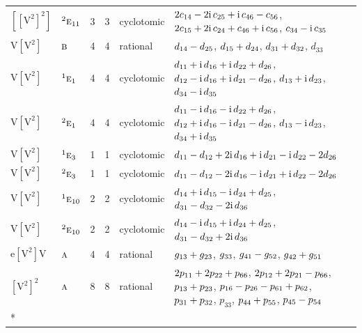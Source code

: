\documentclass[10pt,a4paper]{article}
\numberwithin{equation}{section}
\newcommand{\irr}[1]{\text{\normalfont\scshape #1}}
\newcommand{\conjpair}[1]{{}^{#1}}
\newcommand{\iunit}{\mathrm{i}}
\newcommand{\jahn}[1]{\mathrm{#1}}
\newlength{\fillwidth}\newlength{\cellwidth}\newlength{\colwidth}
\newcommand{\signbreak}{\penalty100\relax}
\begin{document}
{\begin{longtable}{@{}llrrl>{\RaggedRight\arraybackslash}p{\fillwidth}@{}}
$\jahn{[[V^{2}]^{2}]}$ & $\conjpair{2}\irr{e}_{11}$ & 3 & 3 & cyclotomic & $2c_{14} -\signbreak 2\iunit{}\,c_{25} +\signbreak \iunit{}\,c_{46} -\signbreak c_{56}$, $2c_{15} +\signbreak 2\iunit{}\,c_{24} +\signbreak c_{46} +\signbreak \iunit{}\,c_{56}$, $c_{34} -\signbreak \iunit{}\,c_{35}$\\
$\jahn{V[V^{2}]}$ & $\irr{b}$ & 4 & 4 & rational & $d_{14} -\signbreak d_{25}$, $d_{15} +\signbreak d_{24}$, $d_{31} +\signbreak d_{32}$, $d_{33}$\\
$\jahn{V[V^{2}]}$ & $\conjpair{1}\irr{e}_{1}$ & 4 & 4 & cyclotomic & $d_{11} +\signbreak \iunit{}\,d_{16} +\signbreak \iunit{}\,d_{22} +\signbreak d_{26}$, $d_{12} -\signbreak \iunit{}\,d_{16} +\signbreak \iunit{}\,d_{21} -\signbreak d_{26}$, $d_{13} +\signbreak \iunit{}\,d_{23}$, $d_{34} -\signbreak \iunit{}\,d_{35}$\\
$\jahn{V[V^{2}]}$ & $\conjpair{2}\irr{e}_{1}$ & 4 & 4 & cyclotomic & $d_{11} -\signbreak \iunit{}\,d_{16} -\signbreak \iunit{}\,d_{22} +\signbreak d_{26}$, $d_{12} +\signbreak \iunit{}\,d_{16} -\signbreak \iunit{}\,d_{21} -\signbreak d_{26}$, $d_{13} -\signbreak \iunit{}\,d_{23}$, $d_{34} +\signbreak \iunit{}\,d_{35}$\\
$\jahn{V[V^{2}]}$ & $\conjpair{1}\irr{e}_{3}$ & 1 & 1 & cyclotomic & $d_{11} -\signbreak d_{12} +\signbreak 2\iunit{}\,d_{16} +\signbreak \iunit{}\,d_{21} -\signbreak \iunit{}\,d_{22} -\signbreak 2d_{26}$\\
$\jahn{V[V^{2}]}$ & $\conjpair{2}\irr{e}_{3}$ & 1 & 1 & cyclotomic & $d_{11} -\signbreak d_{12} -\signbreak 2\iunit{}\,d_{16} -\signbreak \iunit{}\,d_{21} +\signbreak \iunit{}\,d_{22} -\signbreak 2d_{26}$\\
$\jahn{V[V^{2}]}$ & $\conjpair{1}\irr{e}_{10}$ & 2 & 2 & cyclotomic & $d_{14} +\signbreak \iunit{}\,d_{15} -\signbreak \iunit{}\,d_{24} +\signbreak d_{25}$, $d_{31} -\signbreak d_{32} -\signbreak 2\iunit{}\,d_{36}$\\
$\jahn{V[V^{2}]}$ & $\conjpair{2}\irr{e}_{10}$ & 2 & 2 & cyclotomic & $d_{14} -\signbreak \iunit{}\,d_{15} +\signbreak \iunit{}\,d_{24} +\signbreak d_{25}$, $d_{31} -\signbreak d_{32} +\signbreak 2\iunit{}\,d_{36}$\\
$\jahn{e[V^{2}]V}$ & $\irr{a}$ & 4 & 4 & rational & $\mathnormal{g}_{13} +\signbreak \mathnormal{g}_{23}$, $\mathnormal{g}_{33}$, $\mathnormal{g}_{41} -\signbreak \mathnormal{g}_{52}$, $\mathnormal{g}_{42} +\signbreak \mathnormal{g}_{51}$\\
$\jahn{[V^{2}]^{2}}$ & $\irr{a}$ & 8 & 8 & rational & $2p_{11} +\signbreak 2p_{22} +\signbreak p_{66}$, $2p_{12} +\signbreak 2p_{21} -\signbreak p_{66}$, $p_{13} +\signbreak p_{23}$, $p_{16} -\signbreak p_{26} -\signbreak p_{61} +\signbreak p_{62}$, $p_{31} +\signbreak p_{32}$, $p_{33}$, $p_{44} +\signbreak p_{55}$, $p_{45} -\signbreak p_{54}$\\*

\end{longtable}}
\end{document}
